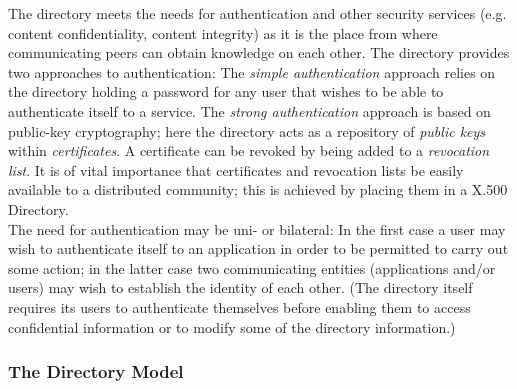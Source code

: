 The directory meets the needs for authentication and other security
services (e.g. content confidentiality, content integrity) as it is the
place from where communicating peers can obtain
knowledge on each other. The directory provides two approaches to
authentication:
\bi
\m The {\em simple authentication} approach relies on the directory holding
a password for any user that wishes to be able to authenticate itself
to a service.
\m The {\em strong authentication} approach is based on public-key
cryptography; here the directory acts as a repository of {\em public keys}
within {\em certificates}.
\ei
A certificate can be revoked by being added to a
{\em revocation list}.
It is of vital importance that certificates and revocation lists be
easily available to a distributed community; this is achieved by placing
them in a X.500 Directory.
\\ [1ex]
The need for authentication may be uni- or bilateral: In the first case
a user may wish to authenticate itself to an application in order
to be permitted to carry out some action; in the latter case two
communicating entities (applications and/or users) may wish to establish
the identity of each other.
(The directory itself requires its users to
authenticate themselves before enabling them to access confidential
information or to modify some of the directory information.)


\subsubsection{The Directory Model}

